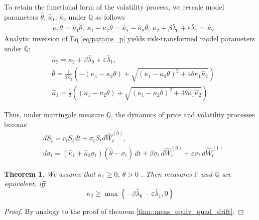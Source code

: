 \documentclass[pdftex,11pt,a4paper] {article}
\newtheorem{theorem}{Theorem}[section]
\begin{document}
To retain the functional form of the volatility process, we rescale model parameters $\hat\theta$, $\hat\kappa_1$, $\hat\kappa_2$ under $\mathbb{Q}$ as follows
\begin{equation}\label{eq:params_p}
\begin{split}
&\kappa_1\theta=\hat\kappa_1\hat\theta, \ \kappa_1-\kappa_2\theta=\hat\kappa_1-\hat\kappa_2\hat\theta, \ \kappa_2+\beta\bar\lambda_0+\varepsilon\bar\lambda_1=\hat\kappa_2
\end{split}
\end{equation}
Analytic inversion of Eq \eqref{eq:params_p} yields risk-transformed model parameters under $\mathbb{Q}$:
\begin{equation}
\begin{split}
& \hat\kappa_2 = \kappa_2+\beta\bar\lambda_0+\varepsilon\bar\lambda_1,\\
& \hat \theta =  \frac{1}{2\hat\kappa_2}\left( - (\kappa_1-\kappa_2\theta) + \sqrt{(\kappa_1-\kappa_2\theta)^{2}+4\theta\kappa_{1}\hat\kappa_2} \right)\\
& \hat \kappa_1 = \frac{1}{2} \left( (\kappa_1-\kappa_2\theta) +  \sqrt{(\kappa_1-\kappa_2\theta)^{2}+4\theta\kappa_{1}\hat\kappa_2} \right)
\end{split}
\end{equation}


Thus, under martingale measure $\mathbb{Q}$, the dynamics of  price and volatility processes become
\begin{equation}\label{eq:dynam_Q2}
\begin{split}
&dS_t= r_t S_tdt + \sigma_t S_t d\hat{W}^{(0)}_t,\\
&d\sigma_t=(\hat\kappa_1+\hat\kappa_2\sigma_t)(\hat\theta-\sigma_t)\,dt+\beta\sigma_t\,d\hat{W}^{(0)}_t+\varepsilon\sigma_t\,d\hat{W}^{(1)}_t
\end{split}
\end{equation}

\begin{theorem}\label{prop:meas_equiv_logsv_quadrift}
We assume that $\kappa_1\ge 0$, $\theta>0$ . Then measures $\mathbb{P}$ and $\mathbb{Q}$ are equivalent, iff
\begin{equation}
\kappa_2\ge \max \left\{ -\beta\bar\lambda_0-\varepsilon\bar\lambda_1, 0 \right\}
\end{equation}
\end{theorem}

\begin{proof}
By analogy to the proof of theorem \ref{thm::meas_equiv_quad_drift}.
\end{proof}
\end{document}
